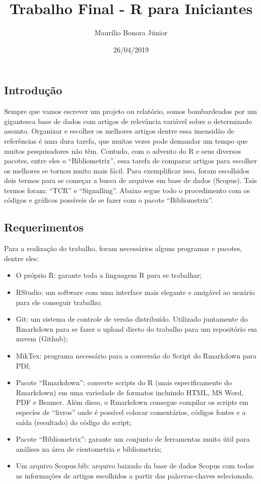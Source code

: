 \documentclass[]{article}
\title{Trabalho Final - R para Iniciantes}
\author{Maurílio Bonora Júnior}
\date{26/04/2019}
\begin{document}
\maketitle

\hypertarget{introducao}{%
\subsection{Introdução}\label{introducao}}

Sempre que vamos escrever um projeto ou relatório, somos bombardeados
por um gigantesca base de dados com artigos de relevância variável sobre
o determinado assunto. Organizar e escolher os melhores artigos dentre
essa imensidão de referências é uma dura tarefa, que muitas vezes pode
demandar um tempo que muitos pesquisadores não têm. Contudo, com o
advento do R e seus diversos pacotes, entre eles o ``Bibliometrix'',
essa tarefa de comparar artigos para escolher os melhores se tornou
muito mais fácil. Para exemplificar isso, foram escolhidos dois termos
para se começar a busca de arquivos em base de dados (Scopus). Tais
termos foram: ``TCR'' e ``Signalling''. Abaixo segue todo o procedimento
com os códigos e gráficos possíveis de se fazer com o pacote
``Bibliometrix''.

\hypertarget{requerimentos}{%
\subsection{Requerimentos}\label{requerimentos}}

Para a realização do trabalho, foram necessários alguns programas e
pacotes, dentre eles:

\begin{itemize}
\item
  O próprio R: garante toda a linguagem R para se trabalhar;
\item
  RStudio: um software com uma interface mais elegante e amigável ao
  usuário para ele conseguir trabalho;
\item
  Git: um sistema de controle de versão distribuído. Utilizado
  juntamente do Rmarkdown para se fazer o upload direto do trabalho para
  um repositório em nuvem (Github);
\item
  MikTex: programa necessário para a conversão do Script do Rmarkdown
  para PDf;
\item
  Pacote ``Rmarkdown'': converte scripts do R (mais especificamente do
  Rmarkdown) em uma variedade de formatos incluindo HTML, MS Word, PDF e
  Beamer. Além disso, o Rmarkdown consegue compilar os scripts em
  especíes de ``livros'' onde é possível colocar comentários, códigos
  fontes e a saída (resultado) do código do script;
\item
  Pacote ``Bibliometrix'': garante um conjunto de ferramentas muito útil
  para análises na área de cientometria e bibliometria;
\item
  Um arquivo Scopus.bib: arquivo baixado da base de dados Scopus com
  todas as informações de artigos escolhidos a partir das
  palavras-chaves selecionado.
\end{itemize}
\end{document}
